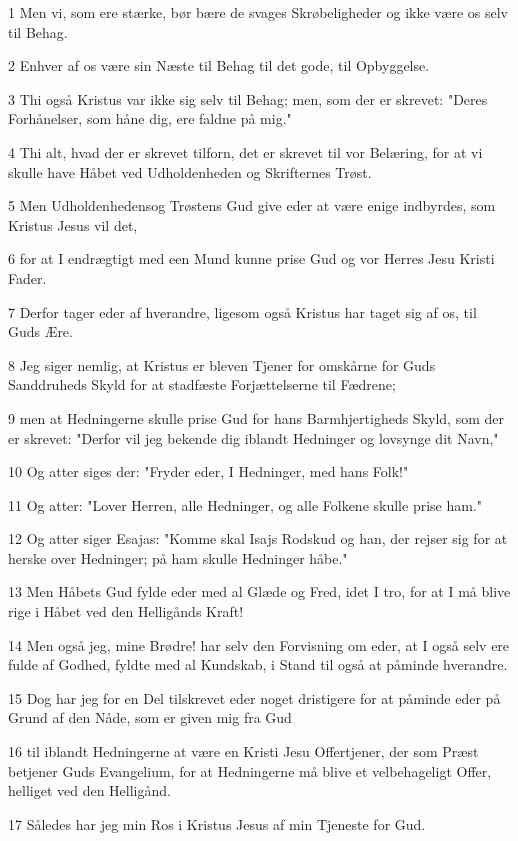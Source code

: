 \par 1 Men vi, som ere stærke, bør bære de svages Skrøbeligheder og ikke være os selv til Behag.
\par 2 Enhver af os være sin Næste til Behag til det gode, til Opbyggelse.
\par 3 Thi også Kristus var ikke sig selv til Behag; men, som der er skrevet: "Deres Forhånelser, som håne dig, ere faldne på mig."
\par 4 Thi alt, hvad der er skrevet tilforn, det er skrevet til vor Belæring, for at vi skulle have Håbet ved Udholdenheden og Skrifternes Trøst.
\par 5 Men Udholdenhedensog Trøstens Gud give eder at være enige indbyrdes, som Kristus Jesus vil det,
\par 6 for at I endrægtigt med een Mund kunne prise Gud og vor Herres Jesu Kristi Fader.
\par 7 Derfor tager eder af hverandre, ligesom også Kristus har taget sig af os, til Guds Ære.
\par 8 Jeg siger nemlig, at Kristus er bleven Tjener for omskårne for Guds Sanddruheds Skyld for at stadfæste Forjættelserne til Fædrene;
\par 9 men at Hedningerne skulle prise Gud for hans Barmhjertigheds Skyld, som der er skrevet: "Derfor vil jeg bekende dig iblandt Hedninger og lovsynge dit Navn,"
\par 10 Og atter siges der: "Fryder eder, I Hedninger, med hans Folk!"
\par 11 Og atter: "Lover Herren, alle Hedninger, og alle Folkene skulle prise ham."
\par 12 Og atter siger Esajas: "Komme skal Isajs Rodskud og han, der rejser sig for at herske over Hedninger; på ham skulle Hedninger håbe."
\par 13 Men Håbets Gud fylde eder med al Glæde og Fred, idet I tro, for at I må blive rige i Håbet ved den Helligånds Kraft!
\par 14 Men også jeg, mine Brødre! har selv den Forvisning om eder, at I også selv ere fulde af Godhed, fyldte med al Kundskab, i Stand til også at påminde hverandre.
\par 15 Dog har jeg for en Del tilskrevet eder noget dristigere for at påminde eder på Grund af den Nåde, som er given mig fra Gud
\par 16 til iblandt Hedningerne at være en Kristi Jesu Offertjener, der som Præst betjener Guds Evangelium, for at Hedningerne må blive et velbehageligt Offer, helliget ved den Helligånd.
\par 17 Således har jeg min Ros i Kristus Jesus af min Tjeneste for Gud.
